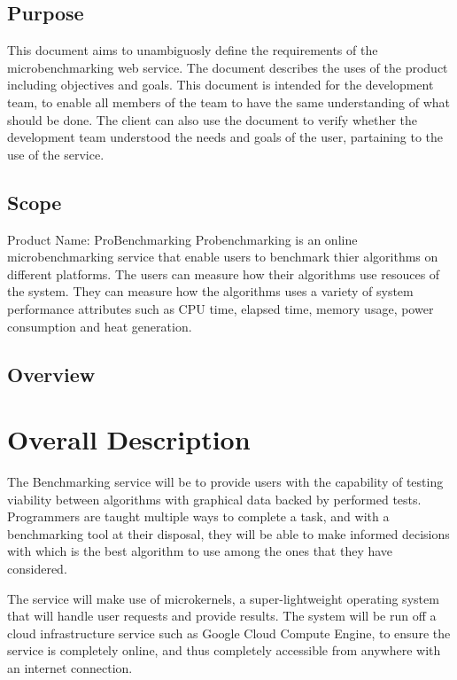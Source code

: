 \documentclass[runningheads,a4paper]{article}
\begin{document}
\subsection{Purpose}
	This document aims to unambiguosly define the requirements of the microbenchmarking web service.
	The document describes the uses of the product including objectives and goals.
	This document is intended for the development team, to enable all members of the team to have the
	same understanding of what should be done. The client can also use the document to verify whether the
	development team understood the needs and goals of the user, partaining to the use of the service.
\subsection{Scope}
	Product Name: ProBenchmarking
	Probenchmarking is an online microbenchmarking service that enable users to benchmark thier algorithms
	on different platforms. The users can measure how their algorithms use resouces of the system. 
	They can measure how the algorithms uses a variety of system performance attributes such as CPU time, elapsed time,
	memory usage, power consumption and heat generation.
\subsection{Overview}

\section{Overall Description}
	The Benchmarking service will be to provide users with the capability of testing viability between algorithms with graphical data backed by performed tests. Programmers are taught multiple ways to complete a task, and with a benchmarking tool at their disposal, they will be able to make informed decisions with which is the best algorithm to use among the ones that they have considered. \newline
	
	The service will make use of microkernels, a super-lightweight operating system that will handle user requests and provide results. The system will be run off a cloud infrastructure service such as Google Cloud Compute Engine, to ensure the service is completely online, and thus completely accessible from anywhere with an internet connection. \newline
	
\end{document}
